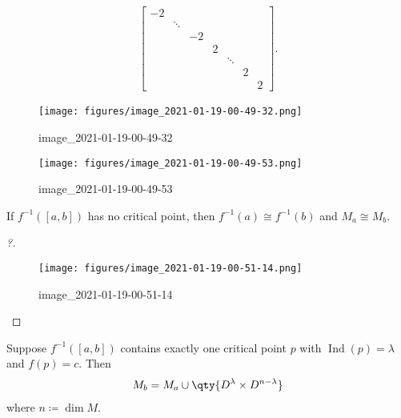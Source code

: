 \begin{align*}
\begin{bmatrix}
-2&&&&&&\\
&\ddots&&&&&\\
&&-2&&&&\\
&&&2&&&\\
&&&&\ddots&&\\
&&&&&2&\\
&&&&&&2
\end{bmatrix}
.\end{align*}

\begin{example}[Sphere]

\begin{figure}
\centering
\texttt{[image: figures/image\_2021-01-19-00-49-32.png]}
\caption{image\_2021-01-19-00-49-32}
\end{figure}

\end{example}

\begin{example}[Torus]

\begin{figure}
\centering
\texttt{[image: figures/image\_2021-01-19-00-49-53.png]}
\caption{image\_2021-01-19-00-49-53}
\end{figure}

\end{example}

\begin{lemma}[?]

If \(f ^{-1} ([a, b])\) has no critical point, then
\(f ^{-1} (a) \cong f ^{-1} (b)\) and \(M_a \cong M_b\).

\end{lemma}

\begin{proof}[?]

\begin{figure}
\centering
\texttt{[image: figures/image\_2021-01-19-00-51-14.png]}
\caption{image\_2021-01-19-00-51-14}
\end{figure}

\end{proof}

\begin{theorem}[?]

Suppose \(f ^{-1} ([a, b])\) contains exactly one critical point \(p\)
with \(\mathop{\mathrm{Ind}}(p) = \lambda\) and \(f(p) = c\). Then
\begin{align*}
M_b = M_a \cup\qty{ D^ \lambda \times D^{n - \lambda} }
\end{align*}
where \(n \coloneqq\dim M\).

\end{theorem}

